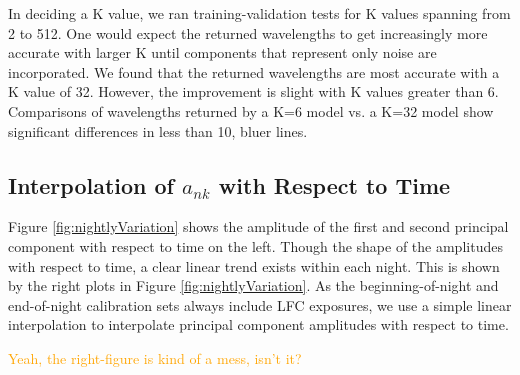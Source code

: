 \documentclass[twocolumn]{aastex63}
\newcommand{\lz}[1]{\textcolor{orange}{#1}}
\begin{document}
In deciding a K value, we ran training-validation tests for K values spanning from 2 to 512.  One would expect the returned wavelengths to get increasingly more accurate with larger K until components that represent only noise are incorporated.  We found that the returned wavelengths are most accurate with a K value of 32.  However, the improvement is slight with K values greater than 6.  Comparisons of wavelengths returned by a K=6 model vs. a K=32 model show significant differences in less than 10, bluer lines.

\subsection{Interpolation of $a_{nk}$ with Respect to Time}
Figure \ref{fig:nightlyVariation} shows the amplitude of the first and second principal component with respect to time on the left.  Though the shape of the amplitudes with respect to time, a clear linear trend exists within each night.  This is shown by the right plots in Figure  \ref{fig:nightlyVariation}.  As the beginning-of-night and end-of-night calibration sets always include LFC exposures, we use a simple linear interpolation to interpolate principal component amplitudes with respect to time.

\lz{Yeah, the right-figure is kind of a mess, isn't it?}
\end{document}
